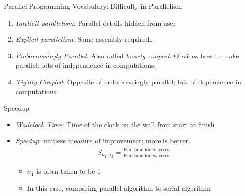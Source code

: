 

\begin{frame}
  \begin{block}{Parallel Programming Vocabulary:  Difficulty in Parallelism}
  \begin{enumerate}[<+-|alert@+>]
    \item \emph{Implicit parallelism}:  Parallel details hidden from user
    \item \emph{Explicit parallelism}:  Some assembly required\dots
    \item \emph{Embarrassingly Parallel}:  Also called \emph{loosely coupled}.  
Obvious how to make parallel; lots of independence in computations.
    \item \emph{Tightly Coupled}:  Opposite of embarrassingly parallel; lots of 
dependence in computations.
  \end{enumerate}  
  \end{block}
\end{frame}


\begin{frame}
  \begin{block}{Speedup}
  \begin{itemize}
    \item \emph{Wallclock Time}:  Time of the clock on the wall from start to 
finish
    \item \emph{Speedup}:  unitless measure of improvement; more is better.
  \begin{align*}
   S_{n_1, n_2} =  \frac{\text{Run time for } n_1 \text{ cores}}{\text{Run time 
for } n_2 \text{ cores}}
  \end{align*}
  \begin{itemize}
    \item   $n_1$ is often taken to be 1
    \item In this case, comparing parallel algorithm to serial algorithm
  \end{itemize}
  \end{itemize}
  \end{block}
\end{frame}


